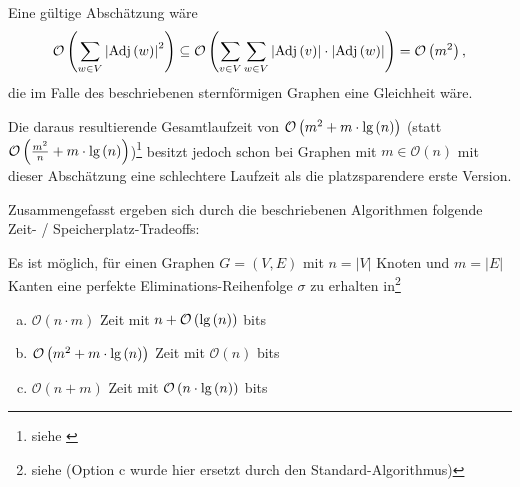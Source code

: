 Eine gültige Abschätzung wäre \[ \mathcal{O} \left( \sum_{w \in V} \left| \textnormal{Adj}\left( w\right) \right|^2 \right) \subseteq \mathcal{O} \left( \sum_{v \in V} \sum_{w \in V} \left| \textnormal{Adj}\left( v\right) \right| \cdot \left| \textnormal{Adj}\left( w\right) \right| \right) = \mathcal{O} \left( m^2 \right), \] die im Falle des beschriebenen sternförmigen Graphen eine Gleichheit wäre.

Die daraus resultierende Gesamtlaufzeit von \( \mathcal{O} \left( m^2 + m \cdot \textnormal{lg} \left( n \right)\right) \) (statt \( \mathcal{O} \left( \frac{m^2}{n} + m \cdot \textnormal{lg} \left( n \right)\right) \))\footnote{siehe \cite[Abschnitt 3.2]{sankardeep}} besitzt jedoch schon bei Graphen mit \( m \in \mathcal{O} \left( n \right) \) mit dieser Abschätzung eine schlechtere Laufzeit als die platzsparendere erste Version.

Zusammengefasst ergeben sich durch die beschriebenen Algorithmen folgende Zeit- / Speicherplatz-Tradeoffs:

\begin{theorem}
	Es ist möglich, für einen Graphen \( G = \left( V, E \right) \) mit \( n = \left| V \right| \) Knoten und  \( m = \left| E \right| \) Kanten eine perfekte Eliminations-Reihenfolge \( \sigma \) zu erhalten in\footnote{siehe \cite[Satz 1]{sankardeep} (Option c wurde hier ersetzt durch den Stan\-dard-Al\-go\-rith\-mus)}
	\begin{enumerate}[a)]
		\item \( \mathcal{O} \left( n \cdot m \right) \) Zeit mit \( n + \mathcal{O} \left( \textnormal{lg} \left( n\right) \right) \) bits
		\item \( \mathcal{O} \left( m ^ 2 + m \cdot \textnormal{lg} \left( n\right) \right) \) Zeit mit \( \mathcal{O} \left( n \right) \) bits
		\item \( \mathcal{O} \left( n + m \right) \) Zeit mit \( \mathcal{O} \left( n \cdot \textnormal{lg} \left( n \right) \right) \) bits
	\end{enumerate}
\end{theorem}

